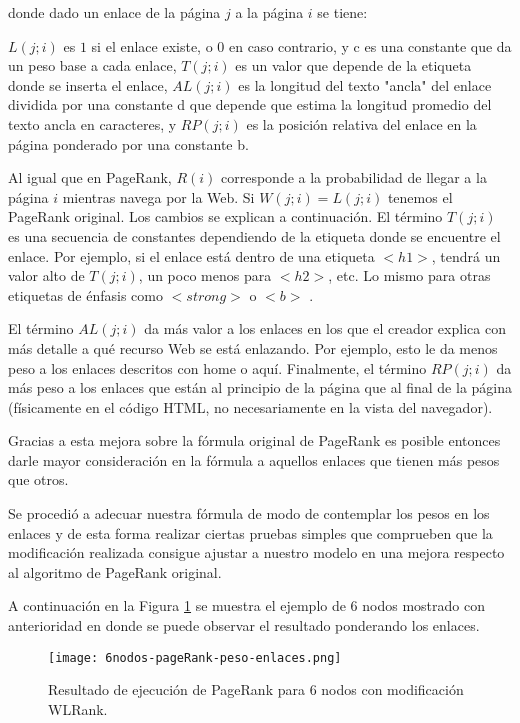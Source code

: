 donde dado un enlace de la página $j$ a la página $i$ se tiene:

$L(j; i)$ es $1$ si el enlace existe, o $0$ en caso contrario, y c es una constante que da un peso base a cada enlace,
$T(j; i)$ es un valor que depende de la etiqueta donde se inserta el enlace,
$AL(j;i)$ es la longitud del texto "ancla" del enlace dividida por una constante d que depende que estima la longitud promedio del texto ancla en caracteres, y $RP(j;i)$ es la posición relativa del enlace en la página ponderado por una constante b.

Al igual que en PageRank, $R(i)$ corresponde a la probabilidad de llegar a la página $i$ mientras navega por la Web. Si $W(j; i) = L(j; i)$ tenemos el PageRank original. Los cambios se explican a continuación. El término $T(j; i)$ es una secuencia de constantes dependiendo de la etiqueta donde se encuentre el enlace. Por ejemplo, si el enlace está dentro de una etiqueta $<h1>$, tendrá un valor alto de $T(j; i)$, un poco menos para $<h2>$, etc. Lo mismo para otras etiquetas de énfasis como $<strong>$ o $<b>$ .

El término $AL(j;i)$ da más valor a los enlaces en los que el creador explica con más detalle a qué recurso Web se está enlazando. Por ejemplo, esto le da menos peso a los enlaces descritos con home o aquí. Finalmente, el término $RP(j; i)$ da más peso a los enlaces que están al principio de la página que al final de la página (físicamente en el código HTML, no necesariamente en la vista del navegador).

Gracias a esta mejora sobre la fórmula original de PageRank es posible entonces darle mayor consideración en la fórmula a aquellos enlaces que tienen más pesos que otros.

Se procedió a adecuar nuestra fórmula de modo de contemplar los pesos en los enlaces y de esta forma realizar ciertas pruebas simples que comprueben que la modificación realizada consigue ajustar a nuestro modelo en una mejora respecto al algoritmo de PageRank original.

A continuación en la Figura \ref{fig:6nodos-pageRank-peso-enlaces} se muestra el ejemplo de 6 nodos mostrado con anterioridad en donde se puede observar el resultado ponderando los enlaces.

\begin{figure}
	\centering
	\texttt{[image: 6nodos-pageRank-peso-enlaces.png]}
	\caption{Resultado de ejecución de PageRank para 6 nodos con modificación WLRank.} 
	\label{fig:6nodos-pageRank-peso-enlaces}
\end{figure}


